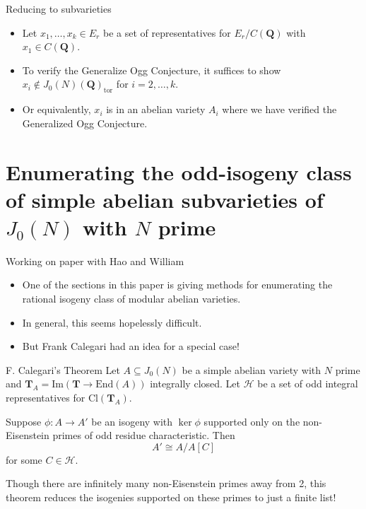 \documentclass{beamer}
\newcommand{\QQ}{\mathbf{Q}}
\newcommand{\TT}{\mathbf{T}}
\renewcommand{\H}{\mathcal{H}}
\renewcommand{\Im}{\mathrm{Im}}
\newcommand{\tor}{\mathrm{tor}}
\newcommand{\Cl}{\mathrm{Cl}}
\newcommand{\End}{\mathrm{End}}
\begin{document}
\begin{frame}{Reducing to subvarieties}
    \begin{itemize}
        \item
            Let $x_1,\ldots,x_k\in E_r$ be a set of representatives for
            $E_r/C(\QQ)$ with $x_1\in C(\QQ)$.
        \item
            To verify the Generalize Ogg Conjecture, it suffices to show
            $x_i\notin J_0(N)(\QQ)_\tor$ for $i=2,\ldots,k$.
        \item
            Or equivalently, $x_i$ is in an abelian variety $A_i$ where we have
            verified the Generalized Ogg Conjecture.
    \end{itemize}
\end{frame}

\section{Enumerating the odd-isogeny class of simple abelian subvarieties of
$J_0(N)$ with $N$ prime}

\begin{frame}{Working on paper with Hao and William}
    \begin{itemize}
        \item 
            One of the sections in this paper is giving methods for enumerating
            the rational isogeny class of modular abelian varieties. 
        \item
            In general, this seems hopelessly difficult.
        \item
            But Frank Calegari had an idea for a special case!
    \end{itemize} 
\end{frame}

\begin{frame}{F. Calegari's Theorem}
    Let $A\subseteq J_0(N)$ be a simple abelian variety with $N$ prime and
    $\TT_A = \Im(\TT\to \End(A))$ integrally closed. Let $\H$ be a set of
    odd integral representatives for $\Cl(\TT_A)$.
    \begin{theorem}[F. Calegari]
        Suppose $\phi:A\to A'$ be an isogeny with $\ker\phi$ supported only on the
        non-Eisenstein primes of odd residue characteristic. Then
        \[
            A'\cong A/A[C]
        \]
        for some $C\in \H$.
    \end{theorem}
    Though there are infinitely many non-Eisenstein primes away from 2, this
    theorem reduces the isogenies supported on these primes to just a finite
    list!
\end{frame}
\end{document}
